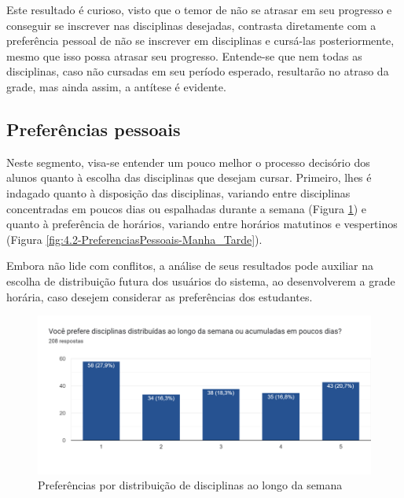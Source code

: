 Este resultado é curioso, visto que o temor de não se atrasar em seu progresso e conseguir se inscrever nas disciplinas desejadas, contrasta diretamente com a preferência pessoal de não se inscrever em disciplinas e cursá-las posteriormente, mesmo que isso possa atrasar seu progresso. Entende-se que nem todas as disciplinas, caso não cursadas em seu período esperado, resultarão no atraso da grade, mas ainda assim, a antítese é evidente.

\subsection{Preferências pessoais} %

Neste segmento, visa-se entender um pouco melhor o processo decisório dos alunos quanto à escolha das disciplinas que desejam cursar. Primeiro, lhes é indagado quanto à disposição das disciplinas, variando entre disciplinas concentradas em poucos dias ou espalhadas durante a semana (Figura \ref{fig:4.1-PreferenciasPessoais-Distribuida_Acumulada}) e quanto à preferência de horários, variando entre horários matutinos e vespertinos (Figura \ref{fig:4.2-PreferenciasPessoais-Manha_Tarde}).

Embora não lide com conflitos, a análise de seus resultados pode auxiliar na escolha de distribuição futura dos usuários do sistema, ao desenvolverem a grade horária, caso desejem considerar as preferências dos estudantes.

\begin{figure}[htbp]\centering
  \caption{\label{fig:4.1-PreferenciasPessoais-Distribuida_Acumulada}Preferências por distribuição de disciplinas ao longo da semana}
  \includegraphics[scale=0.6]{files/img/Forms/4.1-PreferenciasPessoais-Distribuida_Acumulada.png}
\end{figure} %

